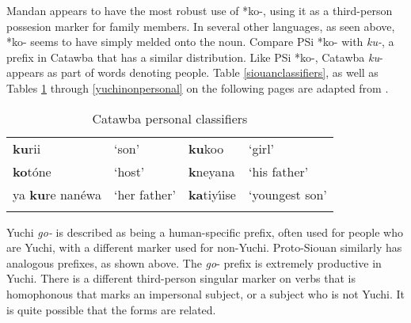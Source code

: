\documentclass[output=paper]{LSP/langsci}
\begin{document}
{Mandan appears to have the most robust use of *ko-, using it as a third-person possesion marker for family members. In several other languages, as seen above, *ko- seems to have simply melded onto the noun. Compare PSi *ko- with \emph{ku-}, a prefix in Catawba that has a similar distribution. Like PSi *ko-, Catawba \emph{ku}- appears as part of words denoting people. Table \ref{siouanclassifiers}, as well as Tables \ref{catawbaclassifiers} through \ref{yuchinonpersonal} on the following pages are adapted from \citet{Rankin1998}.

\begin{table}  
\caption{Catawba personal classifiers} \label{catawbaclassifiers}
    \begin{tabularx}{.75\textwidth}{XXXX}\lsptoprule
        \textbf{ku}rii & `son' & \textbf{ku}koo & `girl' \\ 
        \textbf{ko}t\'one & `host' & \textbf{k\textipa{@}}neyana & `his father' \\ 
			{ya \textbf{ku}re nan\'ewa} & `her father' & {\textbf{ka}tiy\'\i ise} & `youngest son' \\
\lspbottomrule
    \end{tabularx} 
\end{table}

\begin{table} 

\end{table}

Yuchi \textit{go-} is described as being a human-specific prefix, often used for people who are Yuchi, with a different marker used for non-Yuchi. Proto-Siouan similarly has analogous prefixes, as shown above. The \emph{go}- prefix is extremely productive in Yuchi. There is a different third-person singular marker on verbs that is homophonous that marks an impersonal subject, or a subject who is not Yuchi. It is quite possible that the forms are related.

}
\end{document}
